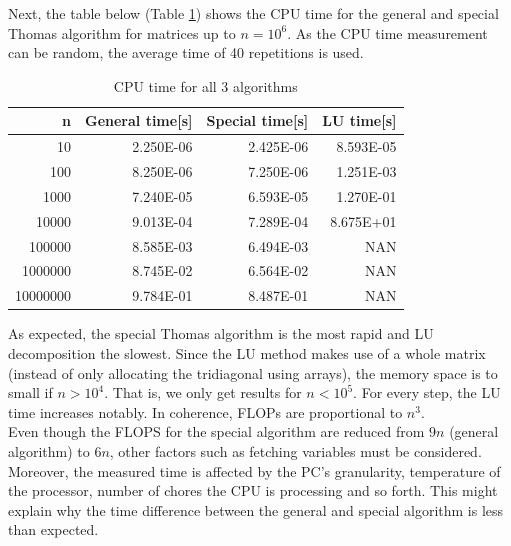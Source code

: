 \documentclass[%
oneside,                 %
final,                   %
10pt]{article}
\begin{document}
Next, the table below (Table \ref{CPUtime}) shows the CPU time for the general and special Thomas algorithm for matrices up to $n=10^6$. As the CPU time measurement can be random, the average time of 40 repetitions is used.
\begin{table}[H]
\caption{CPU time for all 3 algorithms}
\centering
\begin{tabular}{rrrr}
\toprule
    n & General time[s] & Special time[s] & LU time[s] \\
\midrule
    10 &    2.250E-06 &    2.425E-06 &  8.593E-05 \\
   100 &    8.250E-06 &    7.250E-06 &  1.251E-03 \\
   1000 &    7.240E-05 &    6.593E-05 &  1.270E-01 \\
  10000 &    9.013E-04 &    7.289E-04 &  8.675E+01 \\
  100000 &    8.585E-03 &    6.494E-03 &     NAN \\
 1000000 &    8.745E-02 &    6.564E-02 &     NAN \\
 10000000 &    9.784E-01 &    8.487E-01 &     NAN \\
\bottomrule
\end{tabular}
\label{CPUtime}
\end{table}
As expected, the special Thomas algorithm is the most rapid and LU decomposition the slowest. Since the LU method makes use of a whole matrix (instead of only allocating the tridiagonal using arrays), the memory space is to small if $n>10^4$. That is, we only get results for $n<10^5$.
For every step, the LU time increases notably. In coherence, FLOPs are proportional to $n^3$.\\
Even though the FLOPS for the special algorithm are reduced from $9n$ (general algorithm) to $6n$, other factors such as fetching variables must be considered. Moreover, the measured time is affected by the PC's granularity, temperature of the processor, number of chores the CPU is processing and so forth. This might explain why the time difference between the general and special algorithm is less than expected.
\end{document}
